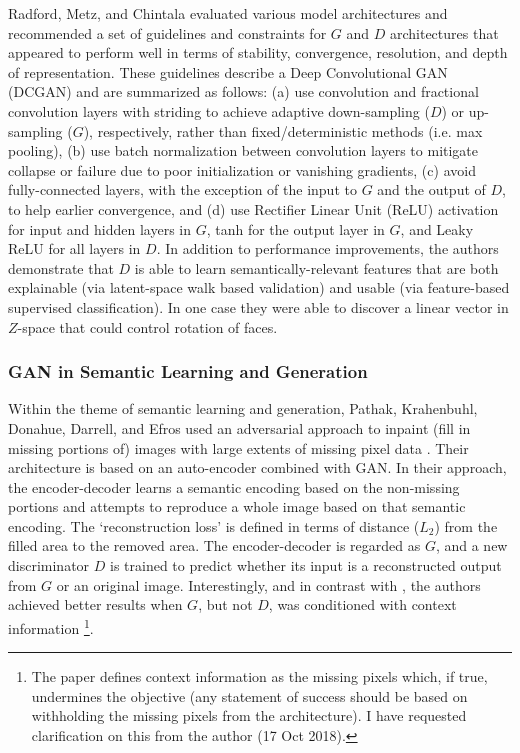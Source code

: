 \documentclass[11pt]{article}
\begin{document}
Radford, Metz, and Chintala \cite{DBLP:journals/corr/RadfordMC15} evaluated various model architectures and recommended a set of guidelines and constraints for $G$ and $D$ architectures that appeared to perform well in terms of stability, convergence, resolution, and depth of representation.  These guidelines describe a Deep Convolutional GAN (DCGAN) and are summarized as follows: (a) use convolution and fractional convolution layers with striding to achieve adaptive down-sampling ($D$) or up-sampling ($G$), respectively, rather than fixed/deterministic methods (i.e. max pooling), (b) use batch normalization between convolution layers to mitigate collapse or failure due to poor initialization or vanishing gradients, (c) avoid fully-connected layers, with the exception of the input to $G$ and the output of $D$, to help earlier convergence, and (d) use Rectifier Linear Unit (ReLU) activation for input and hidden layers in $G$, tanh for the output layer in $G$, and Leaky ReLU for all layers in $D$.  In addition to performance improvements, the authors demonstrate that $D$ is able to learn semantically-relevant features that are both explainable (via latent-space walk based validation) and usable (via feature-based supervised classification).  In one case they were able to discover a linear vector in $Z$-space that could control rotation of faces.  


\subsubsection{GAN in Semantic Learning and Generation}

Within the theme of semantic learning and generation, Pathak, Krahenbuhl, Donahue, Darrell, and Efros used an adversarial approach to inpaint (fill in missing portions of) images with large extents of missing pixel data \cite{pathakCVPR16context}.  Their architecture is based on an auto-encoder \cite{hinton2006reducing} combined with GAN.  In their approach, the encoder-decoder learns a semantic encoding based on the non-missing portions and attempts to reproduce a whole image based on that semantic encoding.  The `reconstruction loss' is defined in terms of distance ($L_2$) from the filled area to the removed area. The encoder-decoder is regarded as $G$, and a new discriminator $D$ is trained to predict whether its input is a reconstructed output from $G$ or an original image.  Interestingly, and in contrast with \cite{mirza2014conditional}, the authors achieved better results when $G$, but not $D$, was conditioned with context information \footnote{The paper defines context information as the missing pixels which, if true, undermines the objective (any statement of success should be based on withholding the missing pixels from the architecture).  I have requested clarification on this from the author (17 Oct 2018).}.
\end{document}
